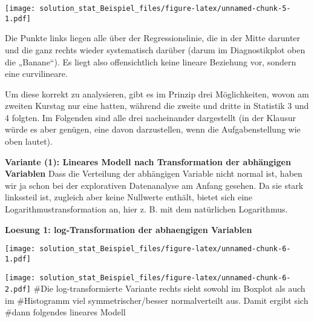 \documentclass[
]{article}
\newenvironment{Shaded}{\begin{snugshade}}{\end{snugshade}}
\newcommand{\AttributeTok}[1]{\textcolor[rgb]{0.77,0.63,0.00}{#1}}
\newcommand{\DecValTok}[1]{\textcolor[rgb]{0.00,0.00,0.81}{#1}}
\newcommand{\FunctionTok}[1]{\textcolor[rgb]{0.00,0.00,0.00}{#1}}
\newcommand{\NormalTok}[1]{#1}
\newcommand{\SpecialCharTok}[1]{\textcolor[rgb]{0.00,0.00,0.00}{#1}}
\begin{document}
\texttt{[image: solution\_stat\_Beispiel\_files/figure-latex/unnamed-chunk-5-1.pdf]}

Die Punkte links liegen alle über der Regressionslinie, die in der Mitte
darunter und die ganz rechts wieder systematisch darüber (darum im
Diagnostikplot oben die „Banane``). Es liegt also offensichtlich keine
lineare Beziehung vor, sondern eine curvilineare.

Um diese korrekt zu analysieren, gibt es im Prinzip drei Möglichkeiten,
wovon am zweiten Kurstag nur eine hatten, während die zweite und dritte
in Statistik 3 und 4 folgten. Im Folgenden sind alle drei nacheinander
dargestellt (in der Klausur würde es aber genügen, eine davon
darzustellen, wenn die Aufgabenstellung wie oben lautet).

\textbf{Variante (1): Lineares Modell nach Transformation der abhängigen
Variablen} Dass die Verteilung der abhängigen Variable nicht normal ist,
haben wir ja schon bei der explorativen Datenanalyse am Anfang gesehen.
Da sie stark linkssteil ist, zugleich aber keine Nullwerte enthält,
bietet sich eine Logarithmustransformation an, hier z. B. mit dem
natürlichen Logarithmus.

\textbf{Loesung 1: log-Transformation der abhaengigen Variablen}

\begin{Shaded}
\end{Shaded}

\texttt{[image: solution\_stat\_Beispiel\_files/figure-latex/unnamed-chunk-6-1.pdf]}

\begin{Shaded}
\end{Shaded}

\texttt{[image: solution\_stat\_Beispiel\_files/figure-latex/unnamed-chunk-6-2.pdf]}
\#Die log-transformierte Variante rechts sieht sowohl im Boxplot als
auch im \#Histogramm viel symmetrischer/besser normalverteilt aus. Damit
ergibt sich \#dann folgendes lineares Modell
\end{document}
